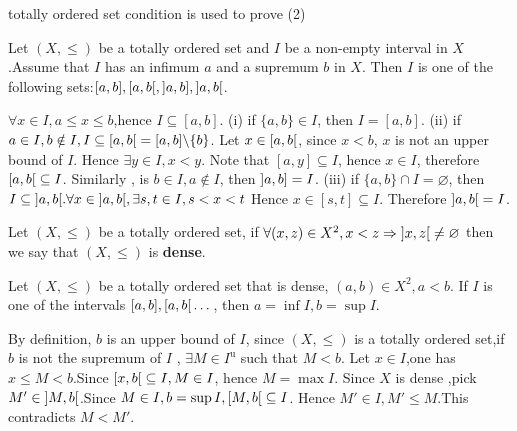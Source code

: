 \documentclass{book}
\numberwithin{equation}{section}
\begin{document}
\begin{remark}
    totally ordered set condition is used to prove (2)
\end{remark}
\begin{propositionenv}
   Let $(X,\le )$ be a totally ordered set and $I $ be a  non-empty interval in $X$  .Assume that $I$ has an infimum $a$ and a supremum $b$ in $X$. Then $I$ is one of the following sets:$[a,b],\interval[open right]{a}{b},\interval[open left]{a}{b},\interval[open]{a}{b}$.
\end{propositionenv}
\begin{proofenv}
    $\forall x\in I ,a\le x\le b $,hence $I\subseteq [a,b]$.
    \newline
    (i) if $\{a,b\}\in I$, then $I=[a,b]$.
    \newline
    (ii) if $a\in I, b\notin I,I\subseteq\interval[open right]{a}{b}=[a,b]\backslash\{b\}$. Let $x\in \interval[open right]{a}{b}$, since $x<b$, $x$ is not an upper bound of $I$. Hence $\exists y\in I, x<y$. Note that $[a,y]\subseteq I$, hence $x\in I$, therefore $\interval[open right]{a}{b}\subseteq I$. Similarly , is $b\in I,a\notin I$, then $\interval[open left]{a}{b}=I$.
    \newline
    (iii) if $\{a,b\}\cap I=\varnothing$, then $I\subseteq\interval[open]{a}{b} .\forall x\in \interval[open]{a}{b},\exists s,t\in I,s<x<t$ Hence $x\in [s,t]\subseteq I$. Therefore $\interval[open]{a}{b}=I$.

\end{proofenv}
\begin{definitionenv}[Dense]
    Let $(X,\le )$ be a totally ordered set, if $\forall (x,z)\in X^2,x<z\Rightarrow \interval[open]{x}{z}\not=\varnothing$ then we say that $(X,\le)$ is \textbf{dense}.
\end{definitionenv}
\begin{propositionenv}
    Let $(X,\le )$ be a totally ordered set that is dense, $(a,b)\in X^2,a<b$. If $I$ is one of the intervals $[a,b],\interval[open right]{a}{b}\dots$, then $a=\inf I,b=\sup I$.
\end{propositionenv}
\begin{proofenv}
    By definition, $b$ is an upper bound of $I$, since $(X,\le)$ is a totally ordered set,if $b$ is not the supremum of $I$ , $\exists M\in I^\mathrm{u}$ such that $M<b$.
    Let $x\in I$,one has $x\le M <b$.Since $\interval[open right]{x}{b}\subseteq I,M\in I$, hence $M=\max I$. Since $X$ is dense ,pick $M'\in \interval[open]{M}{b}$.Since $M\in I,b=\sup I,\interval[open right]{M}{b}\subseteq I$. Hence $M'\in I,M'\le M$.This contradicts $M<M'$.
\end{proofenv}
\end{document}
